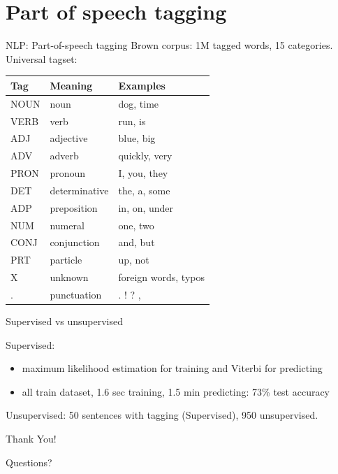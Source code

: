 \documentclass{beamer}
\begin{document}
\section{Part of speech tagging}
\begin{frame}{NLP: Part-of-speech tagging}
    Brown corpus: 1M tagged words, 15 categories.
    Universal tagset:
    \begin{table}[h]
        \centering
        \begin{tabular}{lll}
            \toprule
            \textbf{Tag} & \textbf{Meaning} & \textbf{Examples} \\
            \midrule
            NOUN & noun & dog, time \\
            VERB & verb & run, is \\
            ADJ & adjective & blue, big \\
            ADV & adverb & quickly, very \\
            PRON & pronoun & I, you, they \\
            DET & determinative & the, a, some \\
            ADP & preposition & in, on, under \\
            NUM & numeral & one, two \\
            CONJ & conjunction & and, but \\
            PRT & particle & up, not \\
            X & unknown & foreign words, typos \\
            . & punctuation & . ! ? , \\
            \bottomrule
        \end{tabular}
    \end{table}
\end{frame}
\begin{frame}{Supervised vs unsupervised}

Supervised: 
\begin{itemize}
    \item maximum likelihood estimation for training and Viterbi for predicting 
    \item all train dataset, 1.6 sec training, 1.5 min predicting: 73\% test accuracy
\end{itemize}
Unsupervised: 50 sentences with tagging (Supervised), 950 unsupervised.

\end{frame}

\begin{frame}{Thank You!}
    \begin{center}
        Questions?
    \end{center}
\end{frame}
\end{document}
